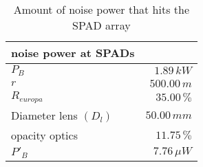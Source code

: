 \begin{table}[H]
\centering
\caption{Amount of noise power that hits the SPAD array}
\label{tab:effective_noise_power}
\begin{tabular}{|l|r|}\hline
    \textbf{noise power at SPADs} & \\
    \hline 
    $P_B$ & $1.89\,k W$ \\
    $r$ & $500.00\, m$ \\
    $R_{europa}$ & $35.00\, \%$ \\
    Diameter lens $(D_l)$ & $50.00\,m m$ \\
    opacity optics & $11.75\, \%$ \\
    $P'_B$ & $7.76\,\mu W$ \\
    \hline 
\end{tabular}
\end{table}
